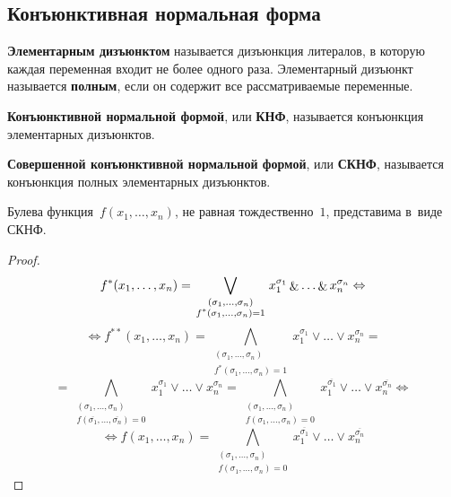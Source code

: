 \subsection{Конъюнктивная нормальная форма}
 \textbf{Элементарным дизъюнктом} называется дизъюнкция литералов, в которую каждая переменная входит не более одного раза.
Элементарный дизъюнкт называется \textbf{полным}, если он содержит все рассматриваемые переменные.

\textbf{Конъюнктивной нормальной формой}, или \textbf{КНФ}, называется конъюнкция элементарных дизъюнктов.

\textbf{Совершенной конъюнктивной нормальной формой}, или \textbf{СКНФ}, называется конъюнкция полных элементарных дизъюнктов.

\begin{statement}
Булева функция~$f(x_1, \ldots, x_n)$, не равная тождественно~$1$, представима в~виде СКНФ.
\end{statement}
\begin{proof}
\begin{equation*}
f^*(x_1, \ldots, x_n) = \bigvee_{\begin{smallmatrix}
(\sigma_1, \ldots, \sigma_n) \\
f^*(\sigma_1, \ldots, \sigma_n) = 1
\end{smallmatrix}} x_1^{\sigma_1} \mathop{\&} \ldots \mathop{\&} x_n^{\sigma_n} \Leftrightarrow
\end{equation*}
\begin{equation*}
\Leftrightarrow f^{**}(x_1, \ldots, x_n) =
\bigwedge_{\begin{smallmatrix}
(\sigma_1, \ldots, \sigma_n) \\
f^*(\sigma_1, \ldots, \sigma_n) = 1
\end{smallmatrix}} x_1^{\sigma_1} \lor \ldots \lor x_n^{\sigma_n} =
\end{equation*}
\begin{equation*}
= \bigwedge_{\begin{smallmatrix}
(\sigma_1, \ldots, \sigma_n) \\
f(\overline{\sigma_1}, \ldots, \overline{\sigma_n}) = 0
\end{smallmatrix}} x_1^{\sigma_1} \lor \ldots \lor x_n^{\sigma_n} =
\bigwedge_{\begin{smallmatrix}
(\sigma_1, \ldots, \sigma_n) \\
f(\sigma_1, \ldots, \sigma_n) = 0
\end{smallmatrix}} x_1^{\overline{\sigma_1}} \lor \ldots \lor x_n^{\overline{\sigma_n}} \Leftrightarrow
\end{equation*}
\begin{equation*}
\Leftrightarrow f(x_1, \ldots, x_n)
= \bigwedge_{\begin{smallmatrix}
(\sigma_1, \ldots, \sigma_n) \\
f(\sigma_1, \ldots, \sigma_n) = 0
\end{smallmatrix}} x_1^{\overline{\sigma_1}} \lor \ldots \lor x_n^{\overline{\sigma_n}}
\end{equation*}
\end{proof}